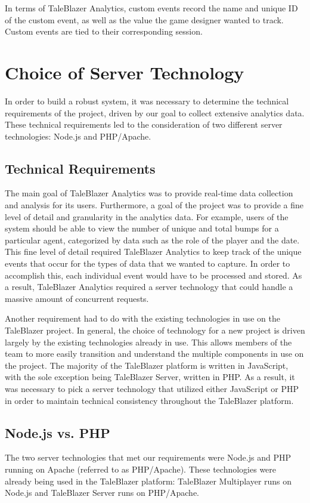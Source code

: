 In terms of TaleBlazer Analytics, custom events record the name and unique ID of the custom event, as well as the value the game designer wanted to track. Custom events are tied to their corresponding session.

\section{Choice of Server Technology}
In order to build a robust system, it was necessary to determine the technical requirements of the project, driven by our goal to collect extensive analytics data. These technical requirements led to the consideration of two different server technologies: Node.js and PHP/Apache. 

\subsection{Technical Requirements}

The main goal of TaleBlazer Analytics was to provide real-time data collection and analysis for its users. Furthermore, a goal of the project was to provide a fine level of detail and granularity in the analytics data. For example, users of the system should be able to view the number of unique and total bumps for a particular agent, categorized by data such as the role of the player and the date. This fine level of detail required TaleBlazer Analytics to keep track of the unique events that occur for the types of data that we wanted to capture. In order to accomplish this, each individual event would have to be processed and stored. As a result, TaleBlazer Analytics required a server technology that could handle a massive amount of concurrent requests. 	

Another requirement had to do with the existing technologies in use on the TaleBlazer project. In general, the choice of technology for a new project is driven largely by the existing technologies already in use. This allows members of the team to more easily transition and understand the multiple components in use on the project. The majority of the TaleBlazer platform is written in JavaScript, with the sole exception being TaleBlazer Server, written in PHP. As a result, it was necessary to pick a server technology that utilized either JavaScript or PHP in order to maintain technical consistency throughout the TaleBlazer platform. 

\subsection{Node.js vs. PHP}
The two server technologies that met our requirements were Node.js and PHP running on Apache (referred to as PHP/Apache). These technologies were already being used in the TaleBlazer platform: TaleBlazer Multiplayer runs on Node.js and TaleBlazer Server runs on PHP/Apache. 

